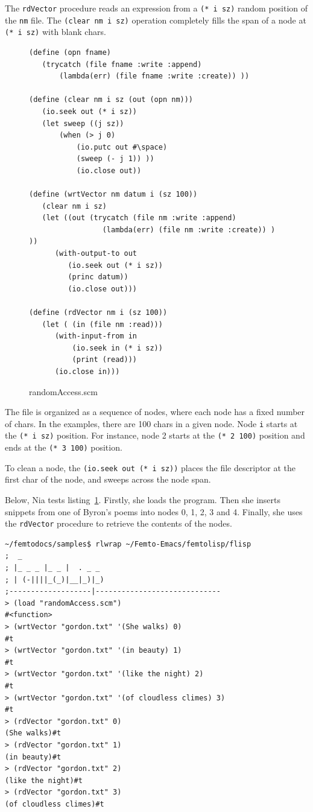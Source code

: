 \documentclass[a4paper,12pt]{book}
\newenvironment{fmpage}[1]
           {\begin{lrbox}{\fmbox}\begin{minipage}{#1}}
           {\end{minipage}\end{lrbox}\fbox{\usebox{\fmbox}}}
\begin{document}
The \verb|rdVector| procedure reads
an expression from a \verb|(* i sz)|
random position of the \verb|nm| file.
The \verb|(clear nm i sz)| operation
completely fills the span of 
a node at \verb|(* i sz)| with
blank chars.

\begin{figure}[!h]
\begin{fmpage}{0.95\textwidth}
\begin{verbatim}
(define (opn fname)
   (trycatch (file fname :write :append)
       (lambda(err) (file fname :write :create)) ))

(define (clear nm i sz (out (opn nm)))
   (io.seek out (* i sz))
   (let sweep ((j sz))
       (when (> j 0)
           (io.putc out #\space)
           (sweep (- j 1)) ))
           (io.close out))

(define (wrtVector nm datum i (sz 100))
   (clear nm i sz)
   (let ((out (trycatch (file nm :write :append)
                 (lambda(err) (file nm :write :create)) ) ))
      (with-output-to out
         (io.seek out (* i sz))
         (princ datum))
         (io.close out)))

(define (rdVector nm i (sz 100))
   (let ( (in (file nm :read)))
      (with-input-from in
          (io.seek in (* i sz))
          (print (read)))
      (io.close in)))
\end{verbatim}
\end{fmpage}
\caption{randomAccess.scm}
\label{randomAccess}
\end{figure}

The file is organized as a sequence
of nodes, where each node has a fixed
number of chars. In the examples,
there are 100 chars in a given node.
Node \verb|i| starts at the 
\verb|(* i sz)| position. For instance,
node 2 starts at the \verb|(* 2 100)|
position and ends at the \verb|(* 3 100)|
position.

To clean a node, the \verb|(io.seek out (* i sz))|
places the file descriptor at the first char
of the node, and sweeps across the node span.



Below, Nia tests   
listing~\ref{randomAccess}. 
Firstly, she loads the 
program. Then she inserts
snippets from one of Byron's
poems into nodes 0, 1, 2, 3 and 4.
Finally, she uses the \verb|rdVector|
procedure to retrieve the contents
of the nodes.


\begin{verbatim}
~/femtodocs/samples$ rlwrap ~/Femto-Emacs/femtolisp/flisp
;  _
; |_ _ _ |_ _ |  . _ _
; | (-||||_(_)|__|_)|_)
;-------------------|-----------------------------
> (load "randomAccess.scm")
#<function>
> (wrtVector "gordon.txt" '(She walks) 0)
#t
> (wrtVector "gordon.txt" '(in beauty) 1)
#t
> (wrtVector "gordon.txt" '(like the night) 2)
#t
> (wrtVector "gordon.txt" '(of cloudless climes) 3)
#t
> (rdVector "gordon.txt" 0)
(She walks)#t
> (rdVector "gordon.txt" 1)
(in beauty)#t
> (rdVector "gordon.txt" 2)
(like the night)#t
> (rdVector "gordon.txt" 3)
(of cloudless climes)#t
\end{verbatim}
\end{document}
